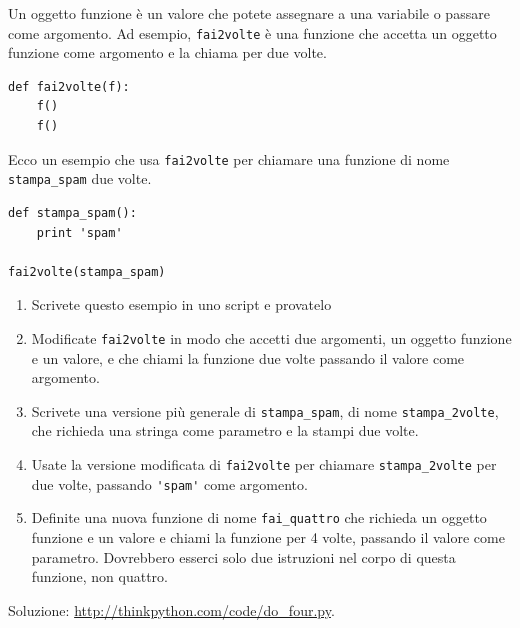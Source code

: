 \documentclass[10pt]{book}
\begin{document}
\vspace{0.2in}
\begin{exercise}

Un oggetto funzione è un valore che potete assegnare a una variabile o passare come argomento. Ad esempio, \verb"fai2volte" è una funzione che accetta un oggetto funzione come argomento e la chiama per due volte.

\begin{verbatim}
def fai2volte(f):
    f()
    f()
\end{verbatim}

Ecco un esempio che usa \verb"fai2volte" per chiamare una funzione di nome \verb"stampa_spam" due volte.

\begin{verbatim}
def stampa_spam():
    print 'spam'

fai2volte(stampa_spam)
\end{verbatim}

\begin{enumerate}

\item Scrivete questo esempio in uno script e provatelo

\item Modificate \verb"fai2volte" in modo che accetti due argomenti, un oggetto funzione e un valore, e che chiami la funzione due volte passando il valore come argomento.

\item Scrivete una versione più generale di \verb"stampa_spam", di nome
\verb"stampa_2volte", che richieda una stringa come parametro e la stampi due volte.

\item Usate la versione modificata di \verb"fai2volte" per chiamare
\verb"stampa_2volte" per due volte, passando \verb"'spam'" come argomento.

\item Definite una nuova funzione di nome \verb"fai_quattro" che richieda un oggetto funzione e un valore e chiami la funzione per 4 volte, passando il valore come parametro. Dovrebbero esserci solo due istruzioni nel corpo di questa funzione, non quattro.

\end{enumerate}

Soluzione: \url{http://thinkpython.com/code/do_four.py}.

\end{exercise}
\end{document}
